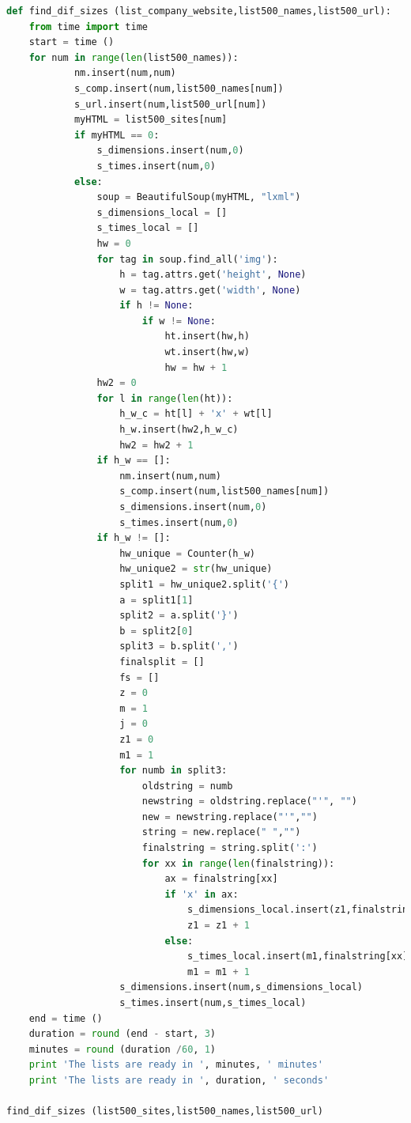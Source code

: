 \documentclass{article}
\begin{document}
\begin{lstlisting}[language=Python]
def find_dif_sizes (list_company_website,list500_names,list500_url):
    from time import time 
    start = time ()
    for num in range(len(list500_names)):
            nm.insert(num,num)                  
            s_comp.insert(num,list500_names[num])
            s_url.insert(num,list500_url[num])
            myHTML = list500_sites[num] 
            if myHTML == 0:
                s_dimensions.insert(num,0)
                s_times.insert(num,0)    
            else: 
                soup = BeautifulSoup(myHTML, "lxml") 
                s_dimensions_local = []
                s_times_local = []
                hw = 0  
                for tag in soup.find_all('img'):
                    h = tag.attrs.get('height', None)
                    w = tag.attrs.get('width', None)
                    if h != None:
                        if w != None:
                            ht.insert(hw,h)
                            wt.insert(hw,w)
                            hw = hw + 1                        
                hw2 = 0
                for l in range(len(ht)):
                    h_w_c = ht[l] + 'x' + wt[l]
                    h_w.insert(hw2,h_w_c)                     
                    hw2 = hw2 + 1    
                if h_w == []:
                    nm.insert(num,num)                  
                    s_comp.insert(num,list500_names[num])
                    s_dimensions.insert(num,0)
                    s_times.insert(num,0)    
                if h_w != []:
                    hw_unique = Counter(h_w)
                    hw_unique2 = str(hw_unique)                    
                    split1 = hw_unique2.split('{')
                    a = split1[1]
                    split2 = a.split('}')
                    b = split2[0]
                    split3 = b.split(',')
                    finalsplit = []
                    fs = []
                    z = 0
                    m = 1
                    j = 0
                    z1 = 0
                    m1 = 1                    
                    for numb in split3:                
                        oldstring = numb
                        newstring = oldstring.replace("'", "")
                        new = newstring.replace("'","")
                        string = new.replace(" ","")
                        finalstring = string.split(':')                       
                        for xx in range(len(finalstring)):
                            ax = finalstring[xx]
                            if 'x' in ax:
                                s_dimensions_local.insert(z1,finalstring[xx])
                                z1 = z1 + 1
                            else:
                                s_times_local.insert(m1,finalstring[xx])
                                m1 = m1 + 1  
                    s_dimensions.insert(num,s_dimensions_local)
                    s_times.insert(num,s_times_local)                
    end = time ()
    duration = round (end - start, 3)
    minutes = round (duration /60, 1)
    print 'The lists are ready in ', minutes, ' minutes'
    print 'The lists are ready in ', duration, ' seconds'

find_dif_sizes (list500_sites,list500_names,list500_url)
\end{lstlisting} 
\end{document}

